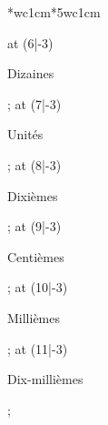 {{{\begin{center}
\begin{NiceTabular}{*{}{wc{1cm}}*{5}{wc{1cm}}}
{{            \tikz\node[rotate=58] at (6|-3) {\begin{minipage}{1.5cm}\begin{center}\scriptsize Dizaines\end{center}\end{minipage}};
            \tikz\node[rotate=58] at (7|-3) {\begin{minipage}{1.5cm}\begin{center}\scriptsize Unités\end{center}\end{minipage}};
            \tikz\node[rotate=58] at (8|-3) {\begin{minipage}{1.5cm}\begin{center}\scriptsize Dixièmes\end{center}\end{minipage}};
            \tikz\node[rotate=58] at (9|-3) {\begin{minipage}{1.5cm}\begin{center}\scriptsize Centièmes\end{center}\end{minipage}};
            \tikz\node[rotate=58] at (10|-3) {\begin{minipage}{1.5cm}\begin{center}\scriptsize Millièmes\end{center}\end{minipage}};
            \tikz\node[rotate=58] at (11|-3) {\begin{minipage}{2cm}\begin{center}\scriptsize Dix-millièmes\end{center}\end{minipage}};
          }%
        }%
      \end{NiceTabular}%
    \end{center}%
    \setlength{\tabcolsep}{100\tabcolsep}%
  }{}%
  }}
